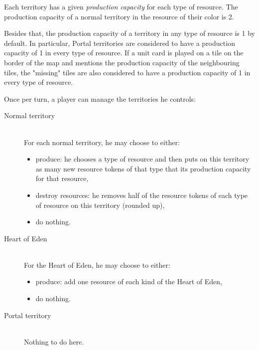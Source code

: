 \documentclass[a4paper]{article}
\begin{document}
    Each territory has a given \textit{production capacity} for each type of resource.
    The production capacity of a normal territory in the resource of their color is 2.
    
    Besides that, the production capacity of a territory in any type of resource
    is 1 by default.
    In particular, Portal territories are considered to have a production capacity
    of 1 in every type of resource.
    If a unit card is played on a tile on the border of the map and mentions the
    production capacity of the neighbouring tiles, the "missing" tiles are also
    considered to have a production capacity of 1 in every type of resource.
    
    \hspace{-1.5em}Once per turn, a player can manage the territories he controls:
    \vspace{-1.3em}
    \begin{description}
        \item[Normal territory] \hfill \\
        	For each normal territory, he may choose to either:
            \vspace{-0.7em}
            \begin{itemize}
        		\item produce: he chooses a type of resource and then puts
            	on this territory as many new resource tokens of that type that its
            	production capacity for that resource,
        		\item destroy resources: he removes half of the resource
            tokens of each type of resource on this territory (rounded up),
        		\item do nothing.
    		\end{itemize}
        \item[Heart of Eden] \hfill \\
        	For the Heart of Eden, he may choose to either:
            \vspace{-0.7em}
            \begin{itemize}
        		\item produce: add one resource of each kind of the Heart of Eden,
        		\item do nothing.
    		\end{itemize}
        \item[Portal territory] \hfill \\
        	Nothing to do here.
    \end{description}
\end{document}
